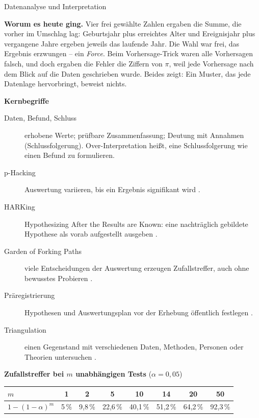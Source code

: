 \begin{handout}{Datenanalyse und Interpretation}

\textbf{Worum es heute ging.} Vier frei gewählte Zahlen ergaben die
Summe, die vorher im Umschlag lag: Geburtsjahr plus erreichtes Alter und
Ereignisjahr plus vergangene Jahre ergeben jeweils das laufende Jahr. Die
Wahl war frei, das Ergebnis erzwungen -- ein \emph{Force}. Beim
Vorhersage-Trick waren alle Vorhersagen falsch, und doch ergaben die
Fehler die Ziffern von $\pi$, weil jede Vorhersage nach dem Blick auf die
Daten geschrieben wurde. Beides zeigt: Ein Muster, das jede Datenlage
hervorbringt, beweist nichts.

\textbf{Kernbegriffe}
\begin{description}
  \item[Daten, Befund, Schluss] erhobene Werte; prüfbare
    Zusammenfassung; Deutung mit Annahmen (Schlussfolgerung). Over-Interpretation heißt, eine
    Schlussfolgerung wie einen Befund zu formulieren.
  \item[p-Hacking] Auswertung variieren, bis ein Ergebnis signifikant wird
    \parencite{simmons2011falsepositive}.
  \item[HARKing] Hypothesizing After the Results are Known: eine
    nachträglich gebildete Hypothese als vorab aufgestellt ausgeben
    \parencite{kerr1998harking}.
  \item[Garden of Forking Paths] viele Entscheidungen der Auswertung
    erzeugen Zufallstreffer, auch ohne bewusstes Probieren
    \parencite{gelmanloken2014forking}.
  \item[Präregistrierung] Hypothesen und Auswertungsplan vor der
    Erhebung öffentlich festlegen \parencite{nosek2018preregistration}.
  \item[Triangulation] einen Gegenstand mit verschiedenen Daten, Methoden,
    Personen oder Theorien untersuchen \parencite{denzin1970research}.
\end{description}

\textbf{Zufallstreffer bei $m$ unabhängigen Tests} ($\alpha=0{,}05$)

\begin{center}
\small
\begin{tabular}{@{}lccccccc@{}}
\toprule
$m$ & 1 & 2 & 5 & 10 & 14 & 20 & 50 \\
\midrule
$1-(1-\alpha)^m$ & 5\,\% & 9,8\,\% & 22,6\,\% & 40,1\,\% & 51,2\,\% & 64,2\,\% & 92,3\,\% \\
\bottomrule
\end{tabular}
\end{center}


\end{handout}
